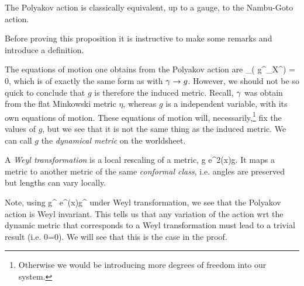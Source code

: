 \bp 
\label{prop:PolyakovNambuGoto}
    The Polyakov action is classically equivalent, up to a gauge, to the Nambu-Goto action. 
\ep 

Before proving this proposition it is instructive to make some remarks and introduce a definition.

\br 
    The equations of motion one obtains from the Polyakov action are 
    \be 
    \label{eqn:EOMDynamicMetric}
        \p_{\a}\Big( g^{\a\beta}\p_{\beta}X^{\mu}\Big) = 0,
    \ee 
    which is of exactly the same form as  with $\gamma \to g$. However, we should not be so quick to conclude that $g$ is therefore the induced metric. Recall, $\gamma$ was obtain from the flat Minkowski metric $\eta$, whereas $g$ is a independent variable, with its own equations of motion. These equations of motion will, necessarily,\footnote{Otherwise we would be introducing more degrees of freedom into our system.} fix the values of $g$, but we see that it is not the same thing as the induced metric. We can call $g$ the \textit{dynamical metric} on the worldsheet. 
\er 

\bd 
    A \textit{Weyl transformation} is a local rescaling of a metric, 
    \bse 
        g \to e^{2\phi(x)}g.
    \ese 
    It maps a metric to another metric of the same \textit{conformal class}, i.e. angles are preserved but lengths can vary locally.
\ed 

\br 
    Note, using 
    \bse 
        g^{\a\beta} \to e^{\phi(x)}g^{\a\beta} 
    \ese 
    under Weyl transformation, we see that the Polyakov action is Weyl invariant. This tells us that any variation of the action wrt the dynamic metric that corresponds to a Weyl transformation must lead to a trivial result (i.e. 0=0). We will see that this is the case in the proof. 
\er 


